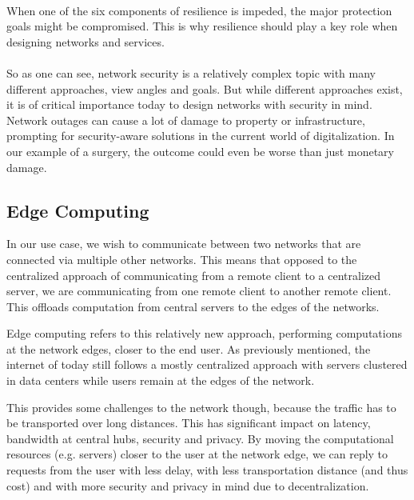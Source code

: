\paragraph{}When one of the six components of resilience is impeded, the major protection goals might be compromised. This is why resilience should play a key role when designing networks and services.

\paragraph{}So as one can see, network security is a relatively complex topic with many different approaches, view angles and goals. But while different approaches exist, it is of critical importance today to design networks with security in mind. Network outages can cause a lot of damage to property or infrastructure, prompting for security-aware solutions in the current world of digitalization. In our example of a surgery, the outcome could even be worse than just monetary damage.

\subsection{Edge Computing}
In our use case, we wish to communicate between two networks that are connected via multiple other networks. This means that opposed to the centralized approach of communicating from a remote client to a centralized server, we are communicating from one remote client to another remote client. This offloads computation from central servers to the edges of the networks.

Edge computing \cite{edgecomputing} refers to this relatively new approach, performing computations at the network edges, closer to the end user. As previously mentioned, the internet of today still follows a mostly centralized approach with servers clustered in data centers while users remain at the edges of the network.

This provides some challenges to the network though, because the traffic has to be transported over long distances. This has significant impact on \gls{latency}, \gls{bandwidth} at central hubs, security and privacy. By moving the computational resources (e.g. servers) closer to the user at the network edge, we can reply to requests from the user with less delay, with less transportation distance (and thus cost) and with more security and privacy in mind due to decentralization.

